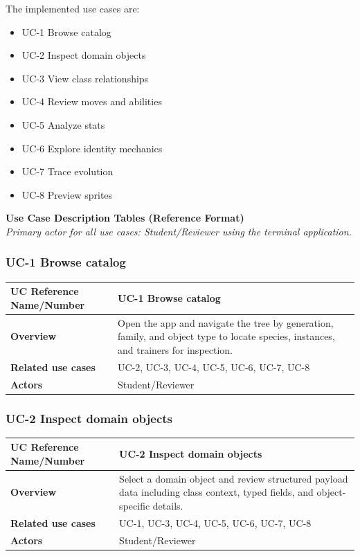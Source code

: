\documentclass[12pt]{article}
\begin{document}
The implemented use cases are:
\begin{itemize}
    \item UC-1 Browse catalog
    \item UC-2 Inspect domain objects
    \item UC-3 View class relationships
    \item UC-4 Review moves and abilities
    \item UC-5 Analyze stats
    \item UC-6 Explore identity mechanics
    \item UC-7 Trace evolution
    \item UC-8 Preview sprites
\end{itemize}

\textbf{Use Case Description Tables (Reference Format)}\\
\textit{Primary actor for all use cases: Student/Reviewer using the terminal
application.}

\subsubsection*{UC-1 Browse catalog}
\begin{tabular}{|p{}|p{}|}
\hline
\textbf{UC Reference Name/Number} & \textbf{UC-1 Browse catalog} \\
\hline
\textbf{Overview} & Open the app and navigate the tree by generation, family,
and object type to locate species, instances, and trainers for inspection. \\
\hline
\textbf{Related use cases} & UC-2, UC-3, UC-4, UC-5, UC-6, UC-7, UC-8 \\
\hline
\textbf{Actors} & Student/Reviewer \\
\hline
\end{tabular}

\subsubsection*{UC-2 Inspect domain objects}
\begin{tabular}{|p{}|p{}|}
\hline
\textbf{UC Reference Name/Number} & \textbf{UC-2 Inspect domain objects} \\
\hline
\textbf{Overview} & Select a domain object and review structured payload data
including class context, typed fields, and object-specific details. \\
\hline
\textbf{Related use cases} & UC-1, UC-3, UC-4, UC-5, UC-6, UC-7, UC-8 \\
\hline
\textbf{Actors} & Student/Reviewer \\
\hline
\end{tabular}
\end{document}
